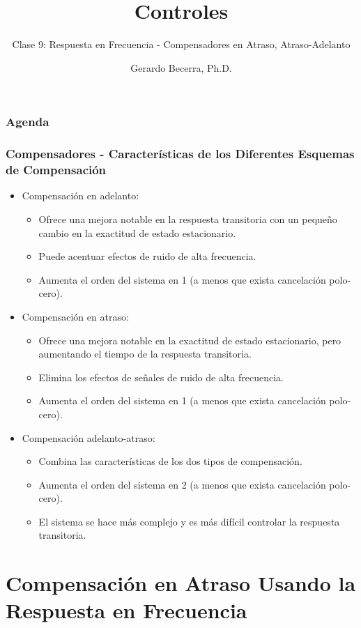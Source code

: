 \documentclass[aspectratio=169,handout]{beamer}
\title{Controles}
\subtitle{\small Clase 9: Respuesta en Frecuencia - Compensadores en Atraso, Atraso-Adelanto}
\author{Gerardo Becerra, Ph.D.}
\institute{Pontificia Universidad Javeriana\\ Departamento de Electrónica}
\date{}
\theoremstyle{definition}
\theoremstyle{plain}
\theoremstyle{remark}
\begin{document}
\frame{\titlepage}	

\begin{frame}[<+->]\frametitle{Agenda}
	\vspace{5mm}
	\tableofcontents
\end{frame}

\begin{frame}[<+->]\frametitle{Compensadores - Características de los Diferentes Esquemas de Compensación}
 	\begin{itemize}
 		\item Compensación en adelanto:
 		\begin{itemize} 
 			\item Ofrece una mejora notable en la respuesta transitoria con un pequeño cambio en la exactitud de estado estacionario.
 			\item Puede acentuar efectos de ruido de alta frecuencia.
 			\item Aumenta el orden del sistema en 1 (a menos que exista cancelación polo-cero).
 		\end{itemize}
 		\item Compensación en atraso:
 		\begin{itemize}
 			\item Ofrece una mejora notable en la exactitud de estado estacionario, pero aumentando el tiempo de la respuesta transitoria.
 			\item Elimina los efectos de señales de ruido de alta frecuencia.
 			\item Aumenta el orden del sistema en 1 (a menos que exista cancelación polo-cero).
 		\end{itemize}
 		\item Compensación adelanto-atraso:
 		\begin{itemize}
 			\item Combina las características de los dos tipos de compensación.
 			\item Aumenta el orden del sistema en 2 (a menos que exista cancelación polo-cero).
 			\item El sistema se hace más complejo y es más difícil controlar la respuesta transitoria.
 		\end{itemize}
  \end{itemize}    
\end{frame}

\section{Compensación en Atraso Usando la Respuesta en Frecuencia}
\end{document}
